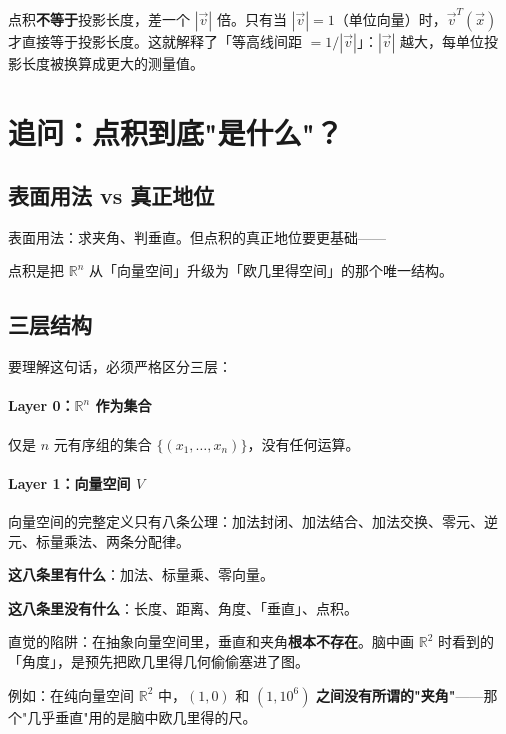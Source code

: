\documentclass[11pt,a4paper]{article}
\begin{document}
\begin{warning}
    点积\textbf{不等于}投影长度，差一个 $|\vec{v}|$ 倍。只有当 $|\vec{v}| = 1$（单位向量）时，$\vec{v}^T(\vec{x})$ 才直接等于投影长度。这就解释了「等高线间距 $= 1/|\vec{v}|$」：$|\vec{v}|$ 越大，每单位投影长度被换算成更大的测量值。
\end{warning}

\section{追问：点积到底"是什么"？}

\subsection{表面用法 vs 真正地位}

表面用法：求夹角、判垂直。但点积的真正地位要更基础——

\begin{insight}
    点积是把 $\mathbb{R}^n$ 从「向量空间」升级为「欧几里得空间」的那个唯一结构。
\end{insight}

\subsection{三层结构}

要理解这句话，必须严格区分三层：

\paragraph{Layer 0：$\mathbb{R}^n$ 作为集合}
仅是 $n$ 元有序组的集合 $\{(x_1, \ldots, x_n)\}$，没有任何运算。

\paragraph{Layer 1：向量空间 $V$}
向量空间的完整定义只有八条公理：加法封闭、加法结合、加法交换、零元、逆元、标量乘法、两条分配律。

\textbf{这八条里有什么}：加法、标量乘、零向量。

\textbf{这八条里没有什么}：长度、距离、角度、「垂直」、点积。

\begin{warning}
    直觉的陷阱：在抽象向量空间里，垂直和夹角\textbf{根本不存在}。脑中画 $\mathbb{R}^2$ 时看到的「角度」，是预先把欧几里得几何偷偷塞进了图。

    例如：在纯向量空间 $\mathbb{R}^2$ 中，$(1, 0)$ 和 $(1, 10^6)$ \textbf{之间没有所谓的"夹角"}——那个"几乎垂直"用的是脑中欧几里得的尺。
\end{warning}
\end{document}
